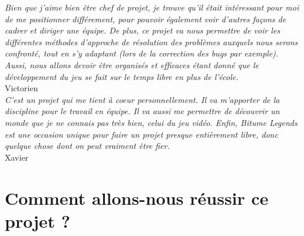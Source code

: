 \documentclass[11pt,a4paper]{article}
\begin{document}
  \textit{Bien que j'aime bien être chef de projet, je trouve qu'il était intéressant 
    pour moi de me positionner différement, pour pouvoir également voir d'autres façons 
    de cadrer et diriger une équipe. De plus, ce projet va nous permettre de voir les différentes
    méthodes d'approche de résolution des problèmes auxquels nous serons confronté, tout en s'y
    adaptant (lors de la correction des bugs par exemple). Aussi, nous allons devoir être organisés
    et efficaces étant donné que le développement du jeu se fait sur le temps libre en plus de l'école.} \\
  \indent Victorien\\

  \textit{C'est un projet qui me tient à coeur personnellement. Il va m'apporter de la discipline pour le travail
    en équipe. Il va aussi me permettre de découvrir un monde que je ne connais pas très bien, celui du jeu vidéo.
    Enfin, Bitume Legends est une occasion unique pour faire un projet presque entièrement libre, donc quelque
    chose dont on peut vraiment être fier.} \\
  \indent Xavier
\clearpage

\section{Comment allons-nous réussir ce projet ?}
\end{document}
